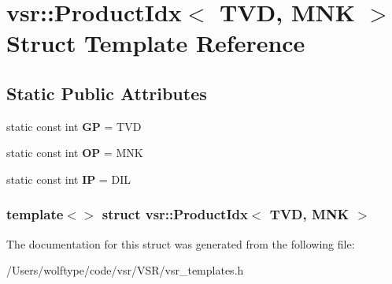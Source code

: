 \hypertarget{structvsr_1_1_product_idx_3_01_t_v_d_00_01_m_n_k_01_4}{\section{vsr\-:\-:Product\-Idx$<$ T\-V\-D, M\-N\-K $>$ Struct Template Reference}
\label{structvsr_1_1_product_idx_3_01_t_v_d_00_01_m_n_k_01_4}
}
\subsection*{Static Public Attributes}
\begin{DoxyCompactItemize}
\item 
\hypertarget{structvsr_1_1_product_idx_3_01_t_v_d_00_01_m_n_k_01_4_ab7c36d28d9570f1c67686a88ab7ac0b0}{static const int {\bfseries G\-P} = T\-V\-D}\label{structvsr_1_1_product_idx_3_01_t_v_d_00_01_m_n_k_01_4_ab7c36d28d9570f1c67686a88ab7ac0b0}

\item 
\hypertarget{structvsr_1_1_product_idx_3_01_t_v_d_00_01_m_n_k_01_4_aaeb406bde3bf8e0f4f10b73cf3642edb}{static const int {\bfseries O\-P} = M\-N\-K}\label{structvsr_1_1_product_idx_3_01_t_v_d_00_01_m_n_k_01_4_aaeb406bde3bf8e0f4f10b73cf3642edb}

\item 
\hypertarget{structvsr_1_1_product_idx_3_01_t_v_d_00_01_m_n_k_01_4_a911477aa5dc2b3d59bb6a5d288137709}{static const int {\bfseries I\-P} = D\-I\-L}\label{structvsr_1_1_product_idx_3_01_t_v_d_00_01_m_n_k_01_4_a911477aa5dc2b3d59bb6a5d288137709}

\end{DoxyCompactItemize}
\subsubsection*{template$<$$>$ struct vsr\-::\-Product\-Idx$<$ T\-V\-D, M\-N\-K $>$}



The documentation for this struct was generated from the following file\-:\begin{DoxyCompactItemize}
\item 
/\-Users/wolftype/code/vsr/\-V\-S\-R/vsr\-\_\-templates.\-h\end{DoxyCompactItemize}
